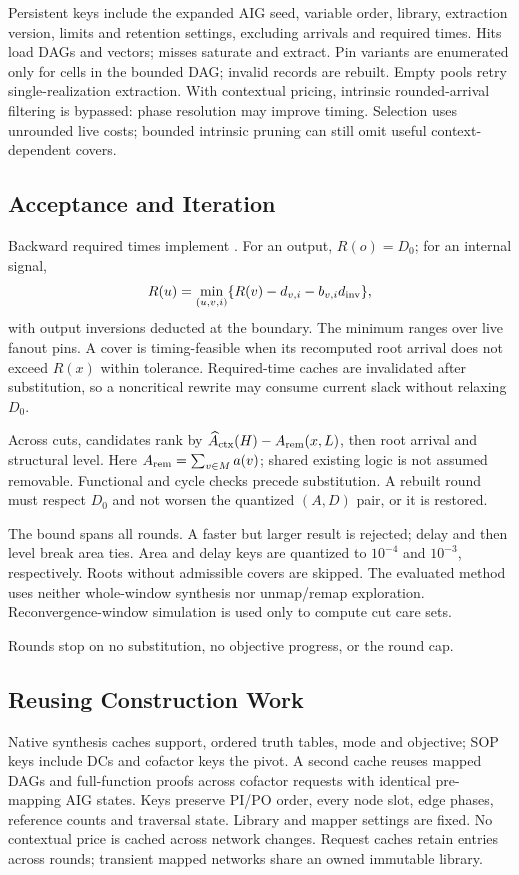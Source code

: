 Persistent keys include the expanded AIG seed, variable order, library, extraction version, limits and retention settings, excluding arrivals and required times. Hits load DAGs and vectors; misses saturate and extract. Pin variants are enumerated only for cells in the bounded DAG; invalid records are rebuilt. Empty pools retry single-realization extraction. With contextual pricing, intrinsic rounded-arrival filtering is bypassed: phase resolution may improve timing. Selection uses unrounded live costs; bounded intrinsic pruning can still omit useful context-dependent covers.

\subsection{Acceptance and Iteration}\label{sec:accept}
Backward required times implement . For an output, $R(o)=D_0$; for an internal signal,
\begin{equation}
 R(u)=\min_{(u,v,i)}\{R(v)-d_{v,i}-b_{v,i}d_{\rm inv}\},\label{eq:required}
\end{equation}
with output inversions deducted at the boundary. The minimum ranges over live fanout pins. A cover is timing-feasible when its recomputed root arrival does not exceed $R(x)$ within tolerance. Required-time caches are invalidated after substitution, so a noncritical rewrite may consume current slack without relaxing $D_0$.

Across cuts, candidates rank by $\widehat A_{\rm ctx}(H)-A_{\rm rem}(x,L)$, then root arrival and structural level. Here $A_{\rm rem}=\sum_{v\in M}a(v)$; shared existing logic is not assumed removable. Functional and cycle checks precede substitution. A rebuilt round must respect $D_0$ and not worsen the quantized $(A,D)$ pair, or it is restored.

The bound spans all rounds. A faster but larger result is rejected; delay and then level break area ties. Area and delay keys are quantized to $10^{-4}$ and $10^{-3}$, respectively. Roots without admissible covers are skipped. The evaluated method uses neither whole-window synthesis nor unmap/remap exploration. Reconvergence-window simulation is used only to compute cut care sets.

Rounds stop on no substitution, no objective progress, or the round cap.

\subsection{Reusing Construction Work}\label{sec:buildreuse}
Native synthesis caches support, ordered truth tables, mode and objective; SOP keys include DCs and cofactor keys the pivot. A second cache reuses mapped DAGs and full-function proofs across cofactor requests with identical pre-mapping AIG states. Keys preserve PI/PO order, every node slot, edge phases, reference counts and traversal state. Library and mapper settings are fixed. No contextual price is cached across network changes. Request caches retain entries across rounds; transient mapped networks share an owned immutable library.

